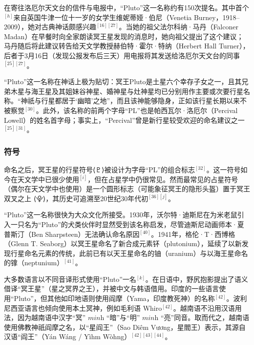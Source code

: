 在寄往洛厄尔天文台的信件与电报中，“Pluto”这一名称约有150次提名。其中首个\(^{[h]}\)来自英国牛津一位十一岁的女学生维妮蒂娅·伯尼（Venetia Burney，1918–2009），她对古典神话颇感兴趣\(^{[16][27]}\)。当她的祖父法尔科纳·马丹（Falconer Madan）在早餐时向全家朗读冥王星发现的消息时，她向祖父提出了这个建议；马丹随后将此建议转告给天文学教授赫伯特·霍尔·特纳（Herbert Hall Turner），后者于3月16日（发现公报发布后三天）用电报将其发送给洛厄尔天文台的同事\(^{[25][27]}\)。

“Pluto”这一名称在神话上极为贴切：冥王Pluto是土星六个幸存子女之一，且其兄弟木星与海王星及其姐妹谷神星、婚神星与灶神星均已分别用作主要或次要行星名称。“神祇与行星都居于‘幽暗’之地”，而且该神能够隐身，正如该行星长期以来不被察觉\(^{[30]}\)。此外，该名称的前两个字母“PL”也是帕西瓦尔·洛厄尔（Percival Lowell）的姓名首字母；事实上，“Percival”曾是新行星较受欢迎的命名建议之一\(^{[25][31]}\)。
\subsubsection{符号}
命名之后，冥王星的行星符号⟨♇⟩被设计为字母“PL”的组合标志\(^{[32]}\)。这一符号如今在天文学中已很少使用\(^{[i]}\)，但在占星学中仍很常见。然而最常见的占星符号（偶尔在天文学中也使用）是一个圆形标志（可能象征冥王的隐形头盔）置于冥王双叉之上 ⟨⯓⟩，其历史可追溯至20世纪30年代初\(^{[36][j]}\)。

“Pluto”这一名称很快为大众文化所接受。1930年，沃尔特·迪斯尼在为米老鼠引入一只名为“Pluto”的犬类伙伴时显然受到该名称启发，尽管迪斯尼动画师本·夏普斯汀（Ben Sharpsteen）无法确认命名原因\(^{[40]}\)。1941年，格伦·T·西博格（Glenn T. Seaborg）以冥王星命名了新合成元素钚（plutonium），延续了以新发现行星命名元素的传统，此前已有以天王星命名的铀（uranium）与以海王星命名的镎（neptunium）\(^{[41]}\)。

大多数语言以不同音译形式使用“Pluto”一名\(^{[k]}\)。在日语中，野尻抱影提出了语义借译“冥王星”（星之冥界之王），并被中文与韩语借用。印度的一些语言使用“Pluto”，但其他如印地语则使用阎摩（Yama，印度教死神）的名称\(^{[42]}\)。波利尼西亚语言也倾向使用本土冥神，例如毛利语 Whiro\(^{[42]}\)。越南语不沿用汉语用法，因为越南语中汉字“冥” $\textit{minh}$ “暗”与“明” $\textit{minh}$ “亮”同音。取而代之，越南语使用佛教神祇阎摩之名，以“星阎王”（Sao Diêm Vương，星閻王）表示，其源自汉语“阎王”（Yán Wáng / Yìhm Wòhng）\(^{[42][43][44]}\)。
